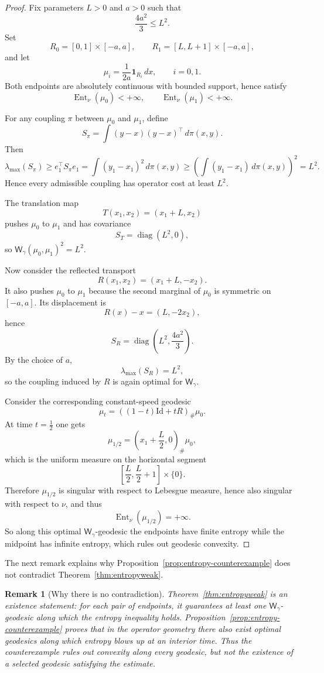 \documentclass{article}
\newtheorem{remark}[theorem]{Remark}
\newcommand{\Wg}{\mathsf{W}_{\gamma}}
\newcommand{\Id}{\mathrm{Id}}
\newcommand{\diag}{\operatorname{diag}}
\begin{document}
\begin{proof}
Fix parameters $L>0$ and $a>0$ such that
$$
\frac{4a^2}{3}\le L^2.
$$
Set
$$
R_0=[0,1]\times[-a,a],
\qquad
R_1=[L,L+1]\times[-a,a],
$$
and let
$$
\mu_i=\frac{1}{2a}\mathbf 1_{R_i}\,dx,
\qquad i=0,1.
$$
Both endpoints are absolutely continuous with bounded support, hence satisfy
$$
\operatorname{Ent}_\nu(\mu_0)<+\infty,
\qquad
\operatorname{Ent}_\nu(\mu_1)<+\infty.
$$

For any coupling $\pi$ between $\mu_0$ and $\mu_1$, define
$$
S_\pi=\int (y-x)(y-x)^\top\,d\pi(x,y).
$$
Then
$$
\lambda_{\max}(S_\pi)\ge e_1^\top S_\pi e_1
=\int (y_1-x_1)^2\,d\pi(x,y)
\ge
\left(\int (y_1-x_1)\,d\pi(x,y)\right)^2
=L^2.
$$
Hence every admissible coupling has operator cost at least $L^2$.

The translation map
$$
T(x_1,x_2)=(x_1+L,x_2)
$$
pushes $\mu_0$ to $\mu_1$ and has covariance
$$
S_T=\diag(L^2,0),
$$
so $\mathsf W_{\gamma}(\mu_0,\mu_1)^2=L^2$.

Now consider the reflected transport
$$
R(x_1,x_2)=(x_1+L,-x_2).
$$
It also pushes $\mu_0$ to $\mu_1$ because the second marginal of $\mu_0$ is symmetric on $[-a,a]$. Its displacement is
$$
R(x)-x=(L,-2x_2),
$$
hence
$$
S_R=\diag\!\left(L^2,\frac{4a^2}{3}\right).
$$
By the choice of $a$,
$$
\lambda_{\max}(S_R)=L^2,
$$
so the coupling induced by $R$ is again optimal for $\mathsf W_{\gamma}$.

Consider the corresponding constant-speed geodesic
$$
\mu_t=((1-t)\Id+tR)_\#\mu_0.
$$
At time $t=\frac12$ one gets
$$
\mu_{1/2}
=
\left(x_1+\frac{L}{2},0\right)_\#\mu_0,
$$
which is the uniform measure on the horizontal segment
$$
\left[\frac{L}{2},\frac{L}{2}+1\right]\times\{0\}.
$$
Therefore $\mu_{1/2}$ is singular with respect to Lebesgue measure, hence also singular with respect to $\nu$, and thus
$$
\operatorname{Ent}_\nu(\mu_{1/2})=+\infty.
$$
So along this optimal $\mathsf W_{\gamma}$-geodesic the endpoints have finite entropy while the midpoint has infinite entropy, which rules out geodesic convexity.
\end{proof}

The next remark explains why Proposition~\ref{prop:entropy-counterexample} does not contradict Theorem~\ref{thm:entropyweak}.
\begin{remark}[Why there is no contradiction]
Theorem~\ref{thm:entropyweak} is an existence statement: for each pair of
endpoints, it guarantees at least one $\Wg$-geodesic along which the entropy
inequality holds. Proposition~\ref{prop:entropy-counterexample} proves that in
the operator geometry there also exist optimal geodesics along which entropy
blows up at an interior time. Thus the counterexample rules out convexity
along every geodesic, but not the existence of a selected geodesic satisfying
the estimate.
\end{remark}
\end{document}
